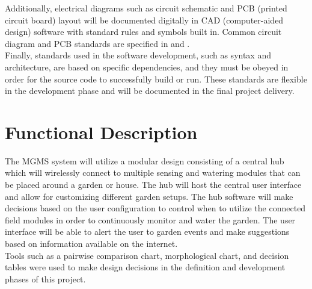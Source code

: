 \documentclass{report}
\begin{document}
Additionally, electrical diagrams such as circuit schematic and PCB (printed circuit board) layout will be documented digitally in CAD (computer-aided design) software with standard rules and symbols built in. Common circuit diagram and PCB standards are specified in \cite{noauthor_ieee_1993} and \cite{noauthor_ieee_2020}. \\

Finally, standards used in the software development, such as syntax and architecture, are based on specific dependencies, and they must be obeyed in order for the source code to successfully build or run. These standards are flexible in the development phase and will be documented in the final project delivery.
\chapter{Functional Description}

The MGMS system will utilize a modular design consisting of a central hub which will wirelessly connect to multiple sensing and watering modules that can be placed around a garden or house. The hub will host the central user interface and allow for customizing different garden setups. The hub software will make decisions based on the user configuration to control when to utilize the connected field modules in order to continuously monitor and water the garden. The user interface will be able to alert the user to garden events and make suggestions based on information available on the internet.\\

Tools such as a pairwise comparison chart, morphological chart, and decision tables were used to make design decisions in the definition and development phases  of this project.
\end{document}
